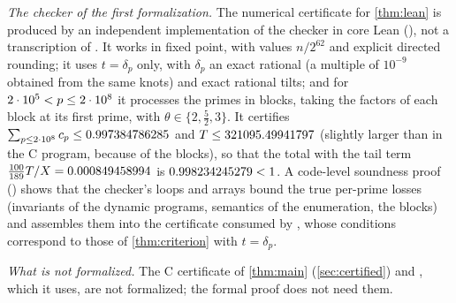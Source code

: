 \emph{The checker of the first formalization.} The numerical certificate for \cref{thm:lean} is produced by an
independent implementation of the checker in core Lean (), not a transcription of
. It works in fixed point, with values $n/2^{62}$ and explicit directed rounding; it uses
$t=\delta_p$ only, with $\delta_p$ an exact rational (a multiple
of $10^{-9}$ obtained from the same knots) and exact rational tilts; and for $2\cdot 10^{5}<p\le2\cdot 10^{8}$ it processes the primes
in blocks, taking the factors of each block at its first prime, with $\theta\in\{2,\frac52,3\}$. It certifies
$\sum_{p\le2\cdot 10^{8}}c_p\le0.997384786285$ and $T\le321095.49941797$ (slightly larger than in the C program, because of the blocks),
so that the total with the tail term $\frac{100}{189}T/X=0.000849458994$ is $0.998234245279<1$. A code-level soundness proof
() shows that the checker's loops and arrays bound the true per-prime losses (invariants of the
dynamic programs, semantics of the enumeration, the blocks) and assembles them into the certificate
 consumed by , whose
conditions correspond to those of \cref{thm:criterion} with $t=\delta_p$.

\emph{What is not formalized.} The C certificate of \cref{thm:main} (\cref{sec:certified}) and
\cite[Theorem~6.1]{BBMST}, which it uses, are not formalized; the formal proof does not need them.

